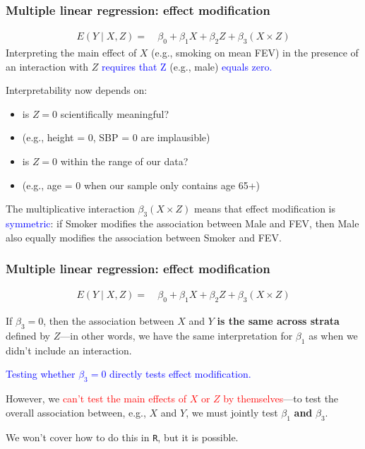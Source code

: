 \documentclass[12pt, 
hyperref={colorlinks=true, linkcolor=blue, urlcolor=cyan}]{beamer}
\begin{document}
\begin{frame}
\frametitle{Multiple linear regression: effect modification}
\vspace{-0.4cm}
\begin{align*}
E(Y \mid X, Z) =& \ \beta_0 + \beta_1 X + \beta_2 Z + \beta_3 (X \times Z)
\end{align*}
Interpreting the main effect of $X$ (e.g., smoking on mean FEV) in the presence of an interaction with $Z$ \textcolor{blue}{requires that Z} (e.g., male) \textcolor{blue}{equals zero.}

Interpretability now depends on: \vspace{-0.2cm}
\begin{itemize}
\item is $Z = 0$ scientifically meaningful? 
\item[] {\small (e.g., height = 0, SBP = 0 are implausible)}
\item is $Z = 0$ within the range of our data? 
\item[] {\small (e.g., age = 0 when our sample only contains age 65+)}
\end{itemize}

The multiplicative interaction $\beta_3 (X \times Z)$ means that effect modification is \textcolor{blue}{symmetric}: if Smoker modifies the association between Male and FEV, then Male also equally modifies the association between Smoker and FEV.
\end{frame}

\begin{frame}
\frametitle{Multiple linear regression: effect modification}
\begin{align*}
E(Y \mid X, Z) =& \ \beta_0 + \beta_1 X + \beta_2 Z + \beta_3 (X \times Z)
\end{align*}

If $\beta_3 = 0$, then the association between $X$ and $Y$ \textbf{is the same across strata} defined by $Z$---in other words, we have the same interpretation for $\beta_1$ as when we didn't include an interaction.

\textcolor{blue}{Testing whether $\beta_3 = 0$ directly tests effect modification.}

However, we \textcolor{red}{can't test the main effects of $X$ or $Z$ by themselves}---to test the overall association between, e.g., $X$ and $Y$, we must jointly test $\beta_1$ \textbf{and} $\beta_3$.

We won't cover how to do this in \texttt{R}, but it is possible.
\end{frame}
\end{document}
